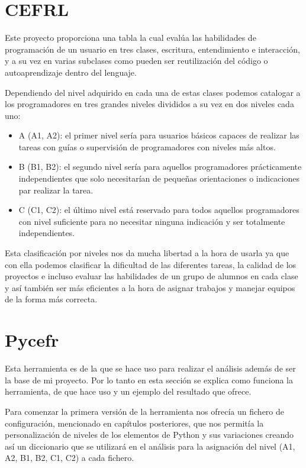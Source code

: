 \documentclass[a4paper, 12pt]{book}
\begin{document}
\section{CEFRL}
\label{CEFRL}

Este proyecto proporciona una tabla la cual evalúa las habilidades de programación de un usuario en tres clases, escritura, entendimiento e interacción, y a su vez en varias subclases como pueden ser reutilización del código o autoaprendizaje dentro del lenguaje.

Dependiendo del nivel adquirido en cada una de estas clases podemos catalogar a los programadores en tres grandes niveles divididos a su vez en dos niveles cada uno: 

\begin{itemize}
	\item A (A1, A2): el primer nivel sería para usuarios básicos capaces de realizar las tareas con guías o supervisión de programadores con niveles más altos.
	\item B (B1, B2): el segundo nivel sería para aquellos programadores prácticamente independientes que solo necesitarían de pequeñas orientaciones o indicaciones par realizar la tarea.
	\item C (C1, C2): el último nivel está reservado para todos aquellos programadores con nivel suficiente para no necesitar ninguna indicación y ser totalmente independientes.
\end{itemize}

Esta clasificación por niveles nos da mucha libertad a la hora de usarla ya que con ella podemos clasificar la dificultad de las diferentes tareas, la calidad de los proyectos e incluso evaluar las habilidades de un grupo de alumnos en cada clase y así también ser más eficientes a la hora de asignar trabajos y manejar equipos de la forma más correcta.

\section{Pycefr}
\label{Pycefr}

Esta herramienta es de la que se hace uso para realizar el análisis además de ser la base de mi proyecto. Por lo tanto en esta sección se explica como funciona la herramienta, de que hace uso y un ejemplo del resultado que ofrece.

Para comenzar la primera versión de la herramienta nos ofrecía un fichero de configuración, mencionado en capítulos posteriores, que nos permitía la personalización de niveles de los elementos de Python y sus variaciones creando así un diccionario que se utilizará en el análisis para la asignación del nivel (A1, A2, B1, B2, C1, C2) a cada fichero.
\end{document}
